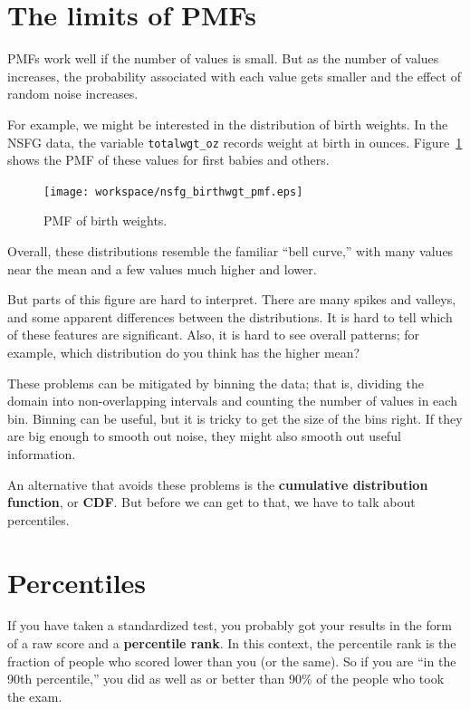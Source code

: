 \documentclass[12pt]{book}
\begin{document}
\section{The limits of PMFs}

PMFs work well if the number of values is small.  But as the
number of values increases, the probability associated with each value
gets smaller and the effect of random noise increases.

For example, we might be interested in the distribution of birth
weights.  In the NSFG data, the variable \verb"totalwgt_oz" records
weight at birth in ounces.  Figure~\ref{nsfg_birthwgt_pmf} shows the
PMF of these values for first babies and others.

\begin{figure}
\centerline{\texttt{[image: workspace/nsfg\_birthwgt\_pmf.eps]}}
\caption{PMF of birth weights.}
\label{nsfg_birthwgt_pmf}
\end{figure}

Overall, these distributions resemble the familiar ``bell curve,'' with
many values near the mean and a few values much higher and lower.

But parts of this figure are hard to interpret.  There are many spikes
and valleys, and some apparent differences between the distributions.
It is hard to tell which of these features are significant.  Also, it
is hard to see overall patterns; for example, which distribution do
you think has the higher mean?

These problems can be mitigated by binning the data;
that is, dividing the domain into non-overlapping intervals and counting
the number of values in each bin.  Binning can be useful, but it is
tricky to get the size of the bins right.  If they are big enough to
smooth out noise, they might also smooth out useful information.

An alternative that avoids these problems is the {\bf cumulative
distribution function}, or {\bf CDF}.  But before we can get to that,
we have to talk about percentiles.


\section{Percentiles}

If you have taken a standardized test, you probably got your
results in the form of a raw score and a {\bf percentile rank}.
In this context, the percentile rank is the fraction of people who
scored lower than you (or the same).  So if you are ``in the 90th
percentile,'' you did as well as or better than 90\% of the people who
took the exam.
\end{document}
